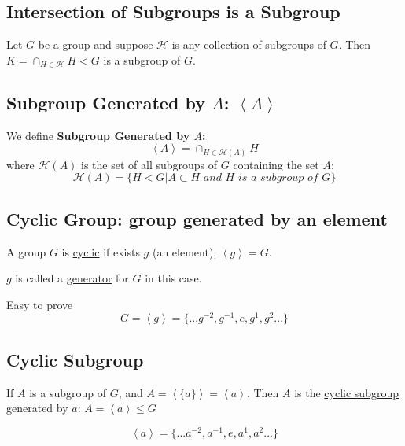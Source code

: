 \documentclass[11pt]{elegantbook}
\begin{document}
\subsection{Intersection of Subgroups is a Subgroup}
\begin{proposition}[Proposition 3.2.2]
Let $G$ be a group and suppose $\mathcal{H}$ is any collection of subgroups of $G$. Then $K=\cap_{H\in\mathcal{H}}H<G$ is a subgroup of $G$.
\end{proposition}


\subsection{Subgroup Generated by $A$: $\left\langle A\right\rangle$}
We define \textbf{Subgroup Generated by $A$:} $$\left\langle A\right\rangle=\cap_{H\in\mathcal{H}(A)}H$$
where $\mathcal{H}(A)$ is the set of all subgroups of $G$ containing the set $A$:
$$\mathcal{H}(A)=\{H<G|A\subset H \textit{ and }H \textit{ is a subgroup of } G \}$$


\subsection{Cyclic Group: group generated by an element}
A group $G$ is \underline{cyclic} if exists $g$ (an element), $\left\langle g\right\rangle=G$.

$g$ is called a \underline{generator} for $G$ in this case.

Easy to prove
$$G=\left\langle g\right\rangle =\{...g^{-2},g^{-1},e,g^1,g^2...\}$$



\subsection{Cyclic Subgroup}
If $A$ is a subgroup of $G$, and $A=\left\langle \{a\}\right\rangle=\left\langle a\right\rangle$. Then $A$ is the \underline{cyclic subgroup} generated by $a$: $A=\left\langle a\right\rangle\leq G$

$$\left\langle a\right\rangle =\{...a^{-2},a^{-1},e,a^1,a^2...\}$$
\end{document}
